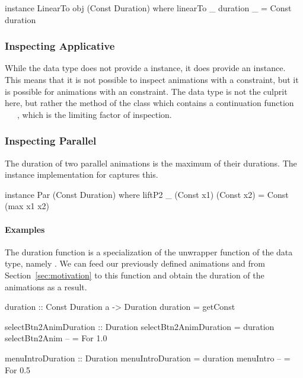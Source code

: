 \begin{code}
instance LinearTo obj (Const Duration) where
  linearTo _ duration _ = Const duration
\end{code}

\subsubsection{Inspecting Applicative}

While the  data type does not provide a  instance, it does
provide an  instance. This means that it is not possible to
inspect animations with a  constraint, but it is possible for
animations with an  constraint. The  data type is not
the culprit here, but rather the \hs{>>=} method of the  class which
contains a continuation function ~\hs{->}~~, which is the
limiting factor of inspection.

\subsubsection{Inspecting Parallel}

The duration of two parallel animations is the maximum of their durations. 
The  instance implementation for  captures
this. 

\begin{code}
instance Par (Const Duration) where
  liftP2 _ (Const x1) (Const x2) = Const (max x1 x2)
\end{code}

\paragraph{Examples}

The duration function is a specialization of the unwrapper function of the
 data type, namely . We can feed our previously defined
animations  and  from
Section~\ref{sec:motivation} to this function and obtain the duration of the
animations as a result.

\begin{code}
duration :: Const Duration a -> Duration
duration = getConst

selectBtn2AnimDuration :: Duration
selectBtn2AnimDuration = duration selectBtn2Anim -- = For 1.0

menuIntroDuration :: Duration
menuIntroDuration = duration menuIntro -- = For 0.5
\end{code}

